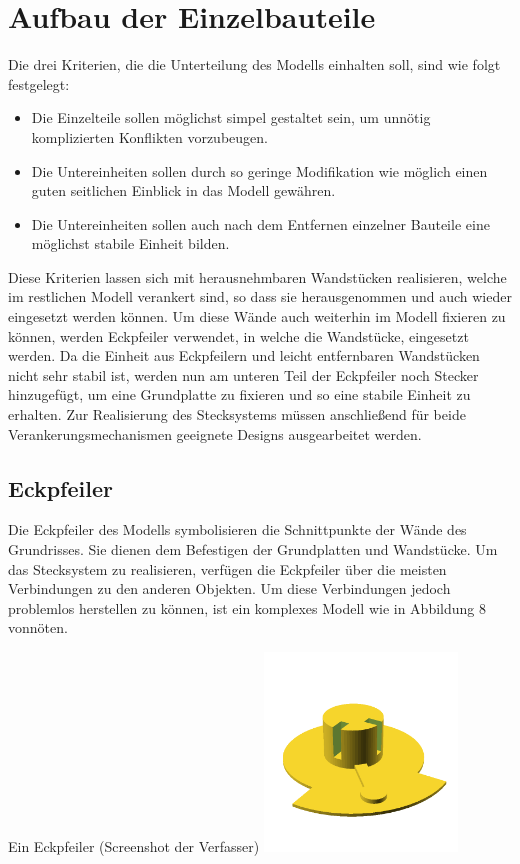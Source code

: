 \section{Aufbau der Einzelbauteile}
Die drei Kriterien, die die Unterteilung des Modells einhalten soll, sind wie folgt festgelegt:

\begin{itemize}
	\item Die Einzelteile sollen möglichst simpel gestaltet sein, um unnötig komplizierten Konflikten vorzubeugen.                      %
	\item Die Untereinheiten sollen durch so geringe Modifikation wie möglich einen guten seitlichen Einblick in das Modell gewähren.
	\item Die Untereinheiten sollen auch nach dem Entfernen einzelner Bauteile eine möglichst stabile Einheit bilden.
\end{itemize}

Diese Kriterien lassen sich mit herausnehmbaren Wandstücken realisieren, welche im restlichen Modell verankert sind, so dass sie herausgenommen und auch wieder eingesetzt werden können.
Um diese Wände auch weiterhin im Modell fixieren zu können, werden Eckpfeiler verwendet, in welche die Wandstücke, eingesetzt werden.
Da die Einheit aus Eckpfeilern und leicht entfernbaren Wandstücken nicht sehr stabil ist, werden nun am unteren Teil der Eckpfeiler noch Stecker hinzugefügt, um eine Grundplatte zu fixieren und so eine stabile Einheit zu erhalten.
Zur Realisierung des Stecksystems müssen anschließend für beide Verankerungsmechanismen geeignete Designs ausgearbeitet werden.\\

\subsection{Eckpfeiler}
Die Eckpfeiler des Modells symbolisieren die Schnittpunkte der Wände des Grundrisses.
Sie dienen dem Befestigen der Grundplatten und Wandstücke.
Um das Stecksystem zu realisieren, verfügen die Eckpfeiler über die meisten Verbindungen zu den anderen Objekten.
Um diese Verbindungen jedoch problemlos herstellen zu können, ist ein komplexes Modell wie in Abbildung 8 vonnöten.
\begin{Bild}{Ein Eckpfeiler (Screenshot der Verfasser)}
	\includegraphics[height=200px]{Bilder/Untereinheit_Ecke}
\end{Bild}
